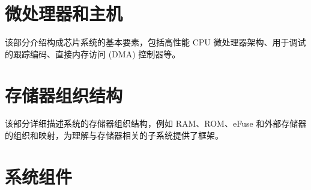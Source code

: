 \documentclass[openany, 10pt]{book}
\begin{document}
\setchineseformatting




\clearpage

\clearpage


\tableofcontents
\clearpage
\listoftables
\clearpage
\listoffigures





\part{微处理器和主机}


该部分介绍构成芯片系统的基本要素，包括高性能 CPU 微处理器架构、用于调试的跟踪编码、直接内存访问 (DMA) 控制器等。



\part{存储器组织结构}

该部分详细描述系统的存储器组织结构，例如 RAM、ROM、eFuse 和外部存储器的组织和映射，为理解与存储器相关的子系统提供了框架。


\part{系统组件}

\end{document}
